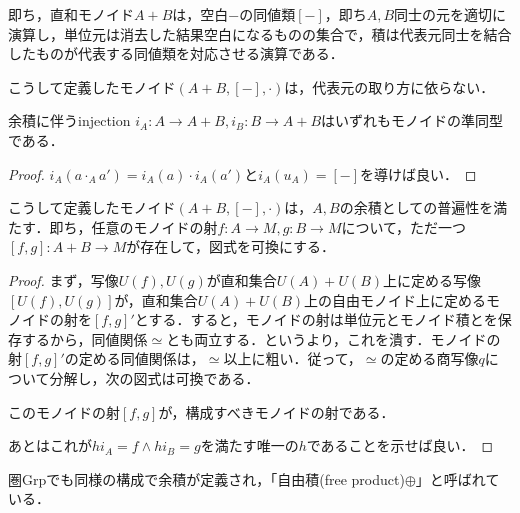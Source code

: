 \documentclass[uplatex, 12pt, dvipdfmx]{jsarticle}
\begin{document}
\begin{example}[一般のモノイドの余積]
\begin{definition*}[一般のモノイドの余積]
        即ち，直和モノイド$A+B$は，空白$-$の同値類$[-]$，即ち$A,B$同士の元を適切に演算し，単位元は消去した結果空白になるものの集合で，積は代表元同士を結合したものが代表する同値類を対応させる演算である．
    \end{definition*}
    \begin{proposition*}
        こうして定義したモノイド$(A+B,[-],\cdot)$は，代表元の取り方に依らない．
    \end{proposition*}
    \begin{proposition*}
        余積に伴うinjection $i_A:A\to A+B,i_B:B\to A+B$はいずれもモノイドの準同型である．
    \end{proposition*}
    \begin{proof}
        $i_A(a\cdot_Aa')=i_A(a)\cdot i_A(a')$と$i_A(u_A)=[-]$を導けば良い．
    \end{proof}
    \begin{proposition*}
        こうして定義したモノイド$(A+B,[-],\cdot)$は，$A,B$の余積としての普遍性を満たす．即ち，任意のモノイドの射$f:A\to M,g:B\to M$について，ただ一つ$[f,g]:A+B\to M$が存在して，図式を可換にする．
    \end{proposition*}
    \begin{proof}
        まず，写像$U(f),U(g)$が直和集合$U(A)+U(B)$上に定める写像$[U(f),U(g)]$が，直和集合$U(A)+U(B)$上の自由モノイド上に定めるモノイドの射を$[f,g]'$とする．すると，モノイドの射は単位元とモノイド積とを保存するから，同値関係$\simeq$とも両立する．というより，これを潰す．モノイドの射$[f,g]'$の定める同値関係は，$\simeq$以上に粗い．従って，$\simeq$の定める商写像$q$について分解し，次の図式は可換である．
        \begin{center}
        \end{center}
        このモノイドの射$[f,g]$が，構成すべきモノイドの射である．

        あとはこれが$hi_A=f\land hi_B=g$を満たす唯一の$h$であることを示せば良い．
    \end{proof}
\end{example}

\begin{example*}
    圏Grpでも同様の構成で余積が定義され，「自由積(free product)$\oplus$」と呼ばれている．
\end{example*}
\end{document}
